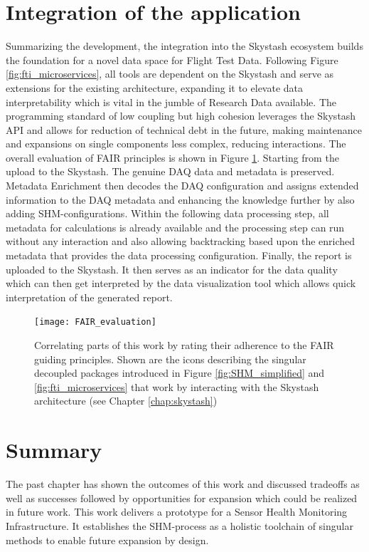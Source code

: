 \section{Integration of the application}

Summarizing the development, the integration into the Skystash ecosystem builds the foundation for a novel data space for Flight Test Data. Following Figure \ref{fig:fti_microservices}, all tools are dependent on the Skystash and serve as extensions for the existing architecture, expanding it to elevate data interpretability which is vital in the jumble of Research Data available. The programming standard of low coupling but high cohesion \cite{stevens_structured_1974} leverages the Skystash API and allows for reduction of technical debt in the future, making maintenance and expansions on single components less complex, reducing interactions.
The overall evaluation of FAIR principles is shown in Figure \ref{fig:FAIR_evaluation}. Starting from the upload to the Skystash. The genuine DAQ data and metadata is preserved. Metadata Enrichment then decodes the DAQ configuration and assigns extended information to the DAQ metadata and enhancing the knowledge further by also adding SHM-configurations. Within the following data processing step, all metadata for calculations is already available and the processing step can run without any interaction and also allowing backtracking based upon the enriched metadata that provides the data processing configuration. Finally, the report is uploaded to the Skystash. It then serves as an indicator for the data quality which can then get interpreted by the data visualization tool which allows quick interpretation of the generated report.


\begin{figure}
    \centering
    \texttt{[image: FAIR\_evaluation]}
    \caption[FAIR-correlation matrix for the SHM-]{Correlating parts of this work by rating their adherence to the FAIR guiding principles. Shown are the icons describing the singular decoupled packages introduced in Figure \ref{fig:SHM_simplified} and \ref{fig:fti_microservices} that work by interacting with the Skystash architecture (see Chapter \ref{chap:skystash})}
    \label{fig:FAIR_evaluation}
\end{figure}

\section{Summary}
The past chapter has shown the outcomes of this work and discussed tradeoffs as well as successes followed by opportunities for expansion which could be realized in future work.
This work delivers a prototype for a Sensor Health Monitoring Infrastructure. It establishes the SHM-process as a holistic toolchain of singular methods to enable future expansion by design.




